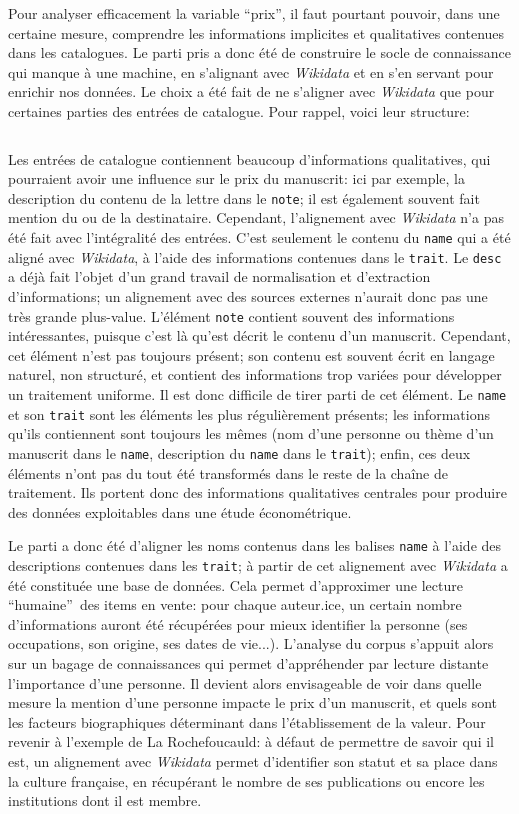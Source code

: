 \documentclass[a4paper, 12pt, twoside]{book}
\newcommand{\tname}{\texttt{name}}
\newcommand{\ttrait}{\texttt{trait}}
\newcommand{\tdesc}{\texttt{desc}}
\newcommand{\tnote}{\texttt{note}}
\newcommand{\wkd}{\textit{Wikidata}}
\begin{document}
Pour analyser efficacement la variable \enquote{prix}, il faut pourtant pouvoir, dans une certaine mesure, comprendre les informations implicites et qualitatives contenues dans les catalogues. Le parti pris a donc été de construire le socle de connaissance qui manque à une machine, en s'alignant avec \wkd{} et en s'en servant pour enrichir nos données. Le choix a été fait de ne s'aligner avec \wkd{} que pour certaines parties des entrées de catalogue. Pour rappel, voici leur structure:

\inputminted[linenos, breaklines, tabsize=4]{xml}{code/tei_item.xml}

Les entrées de catalogue contiennent beaucoup d'informations qualitatives, qui pourraient avoir une influence sur le prix du manuscrit: ici par exemple, la description du contenu de la lettre dans le \tnote{}; il est également souvent fait mention du ou de la destinataire. Cependant, l'alignement avec \wkd{} n'a pas été fait avec l'intégralité des entrées. C'est seulement le contenu du \tname{} qui a été aligné avec \wkd{}, à l'aide des informations contenues dans le \ttrait{}. Le \tdesc{} a déjà fait l'objet d'un grand travail de normalisation et d'extraction d'informations; un alignement avec des sources externes n'aurait donc pas une très grande plus-value. L'élément \tnote{} contient souvent des informations intéressantes, puisque c'est là qu'est décrit le contenu d'un manuscrit. Cependant, cet élément n'est pas toujours présent; son contenu est souvent écrit en langage naturel, non structuré, et contient des informations trop variées pour développer un traitement uniforme. Il est donc difficile de tirer parti de cet élément. Le \tname{} et son \ttrait{} sont les éléments les plus régulièrement présents; les informations qu'ils contiennent sont toujours les mêmes (nom d'une personne ou thème d'un manuscrit dans le \tname{}, description du \tname{} dans le \ttrait{}); enfin, ces deux éléments n'ont pas du tout été transformés dans le reste de la chaîne de traitement. Ils portent donc des informations qualitatives centrales pour produire des données exploitables dans une étude économétrique.

Le parti a donc été d'aligner les noms contenus dans les balises \tname{} à l'aide des descriptions contenues dans les \ttrait{}; à partir de cet alignement avec \wkd{} a été constituée une base de données. Cela permet d'approximer une lecture \enquote{humaine} des items en vente: pour chaque auteur.ice, un certain nombre d'informations auront été récupérées pour mieux identifier la personne (ses occupations, son origine, ses dates de vie...). L'analyse du corpus s'appuit alors sur un bagage de connaissances qui permet d'appréhender par lecture distante l'importance d'une personne. Il devient alors envisageable de voir dans quelle mesure la mention d'une personne impacte le prix d'un manuscrit, et quels sont les facteurs biographiques déterminant dans l'établissement de la valeur. Pour revenir à l'exemple de La Rochefoucauld: à défaut de permettre de savoir qui il est, un alignement avec \wkd{} permet d'identifier son statut et sa place dans la culture française, en récupérant le nombre de ses publications ou encore les institutions dont il est membre.
\end{document}
